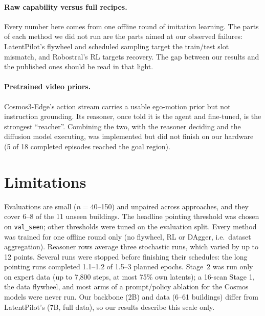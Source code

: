 \documentclass[11pt]{article}
\begin{document}
\paragraph{Raw capability versus full recipes.}
Every number here comes from one offline round of imitation learning. The parts of each method we did not run are
the parts aimed at our observed failures: LatentPilot's flywheel and scheduled sampling target the train/test slot
mismatch, and Robostral's RL targets recovery. The gap between our results and the published ones should be read in
that light.

\paragraph{Pretrained video priors.}
Cosmos3-Edge's action stream carries a usable ego-motion prior but not instruction grounding. Its reasoner, once told
it is the agent and fine-tuned, is the strongest ``reacher''. Combining the two, with the reasoner deciding and the
diffusion model executing, was implemented but did not finish on our hardware (5 of 18 completed episodes reached the
goal region).

\section{Limitations}

Evaluations are small ($n{=}40$--150) and unpaired across approaches, and they cover 6--8 of the 11 unseen buildings.
The headline pointing threshold was chosen on \texttt{val\_seen}; other thresholds were tuned on the evaluation split.
Every method was trained for one offline round only (no flywheel, RL or DAgger, i.e.\ dataset aggregation). Reasoner rows average three stochastic runs, which varied by up to 12 points. Several runs were stopped before finishing their schedules:
the long pointing runs completed 1.1--1.2 of 1.5--3 planned epochs. Stage~2 was run only on expert data (up to 7,800 steps, at most 75\% own latents); a
16-scan Stage 1, the data flywheel, and most arms of a prompt/policy ablation for the Cosmos models were never run. Our backbone (2B) and
data (6--61 buildings) differ from LatentPilot's (7B, full data), so our results describe this scale only.

\end{document}
